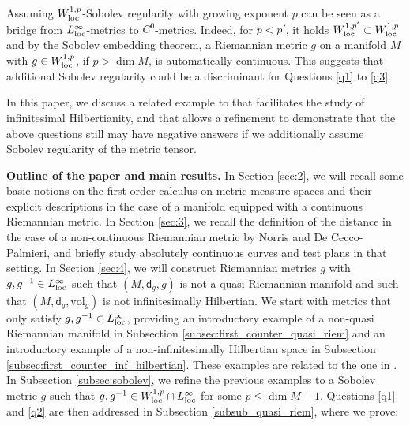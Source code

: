 \documentclass[a4paper,10pt]{article}
\numberwithin{equation}{section}
\newcommand{\vol}{\mathrm{vol}}
\newcommand{\sfd}{\mathsf d}
\begin{document}
Assuming $W^{1,p}_{\rm loc}$-Sobolev regularity with growing exponent $p$ can be seen as a bridge from $L^\infty_{\rm loc}$-metrics to $C^0$-metrics.
Indeed, for $p<p'$, it holds $W^{1,p'}_{\rm loc} \subset W^{1,p}_{\rm loc}$ and by the Sobolev embedding theorem, a Riemannian metric $g$ on a manifold $M$ with $g \in W^{1,p}_{\rm loc}$, if $p > \dim M$, is automatically continuous. This suggests that additional Sobolev regularity could be a discriminant for Questions \ref{q1} to \ref{q3}.

In this paper, we discuss a related example to \cite{de1995lip} that facilitates the study of infinitesimal Hilbertianity, and that allows a refinement to demonstrate that the above questions still may have negative answers if we additionally assume Sobolev regularity of the metric tensor. 

\textbf{Outline of the paper and main results.}
In Section \ref{sec:2}, we will recall some basic notions on the first order calculus on metric measure spaces and their explicit descriptions in the case of a manifold equipped with a continuous Riemannian metric. In Section \ref{sec:3}, we recall the definition of the distance in the case of a non-continuous Riemannian metric by Norris and De Cecco-Palmieri, and briefly study absolutely continuous curves and test plans in that setting. 
In Section \ref{sec:4}, we will construct Riemannian metrics $g$ with $g, g^{-1} \in L^\infty_{\rm loc}$ such that $(M, \sfd_g, g)$ is not a quasi-Riemannian manifold and such that $(M, \sfd_g, \vol_g)$ is not infinitesimally Hilbertian. We start with metrics that only satisfy $g, g^{-1} \in L^\infty_{\rm loc}$, providing an introductory example of a non-quasi Riemannian manifold in Subsection \ref{subsec:first_counter_quasi_riem} and an introductory example of a non-infinitesimally Hilbertian space in Subsection \ref{subsec:first_counter_inf_hilbertian}. These examples are related to the one in \cite{de1995lip}.
In Subsection \ref{subsec:sobolev}, we refine the previous examples to a Sobolev metric $g$ such that $g, g^{-1} \in W^{1,p}_{\rm loc}\cap L^\infty_{\rm loc}$ for some $p \leq \dim M -1$. 
Questions \ref{q1} and \ref{q2} are then addressed in Subsection \ref{subsub_quasi_riem}, where we prove:
\smallskip
\end{document}
